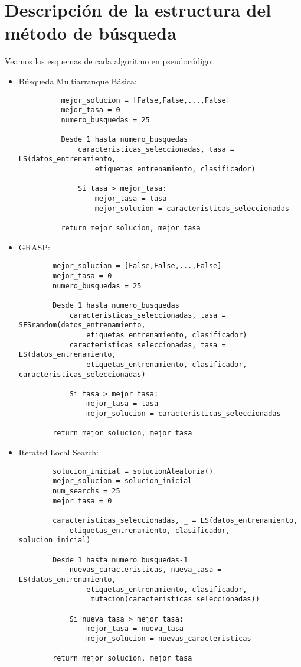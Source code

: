 \documentclass[a4paper, 11pt]{article}
\begin{document}
  \section{Descripción de la estructura del método de búsqueda}
    Veamos los esquemas de cada algoritmo en pseudocódigo:
    \begin{itemize}
      \item Búsqueda Multiarranque Básica:
        \begin{verbatim}
          mejor_solucion = [False,False,...,False]
          mejor_tasa = 0
          numero_busquedas = 25

          Desde 1 hasta numero_busquedas
              caracteristicas_seleccionadas, tasa = LS(datos_entrenamiento,
                  etiquetas_entrenamiento, clasificador)

              Si tasa > mejor_tasa:
                  mejor_tasa = tasa
                  mejor_solucion = caracteristicas_seleccionadas

          return mejor_solucion, mejor_tasa
        \end{verbatim}
      \item GRASP:
      \begin{verbatim}
        mejor_solucion = [False,False,...,False]
        mejor_tasa = 0
        numero_busquedas = 25

        Desde 1 hasta numero_busquedas
            caracteristicas_seleccionadas, tasa = SFSrandom(datos_entrenamiento,
                etiquetas_entrenamiento, clasificador)
            caracteristicas_seleccionadas, tasa = LS(datos_entrenamiento,
                etiquetas_entrenamiento, clasificador, caracteristicas_seleccionadas)

            Si tasa > mejor_tasa:
                mejor_tasa = tasa
                mejor_solucion = caracteristicas_seleccionadas

        return mejor_solucion, mejor_tasa
      \end{verbatim}
      \item Iterated Local Search:
      \begin{verbatim}
        solucion_inicial = solucionAleatoria()
        mejor_solucion = solucion_inicial
        num_searchs = 25
        mejor_tasa = 0

        caracteristicas_seleccionadas, _ = LS(datos_entrenamiento,
            etiquetas_entrenamiento, clasificador, solucion_inicial)

        Desde 1 hasta numero_busquedas-1
            nuevas_caracteristicas, nueva_tasa = LS(datos_entrenamiento,
                etiquetas_entrenamiento, clasificador,
                 mutacion(caracteristicas_seleccionadas))

            Si nueva_tasa > mejor_tasa:
                mejor_tasa = nueva_tasa
                mejor_solucion = nuevas_caracteristicas

        return mejor_solucion, mejor_tasa
      \end{verbatim}
    \end{itemize}
\end{document}
